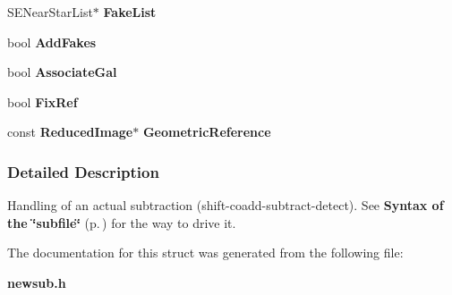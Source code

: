 \begin{CompactItemize}
\item 
{}
SENear\-Star\-List$\ast$ {\bf Fake\-List}\label{struct_newsub_m10}

\item 
{}
bool {\bf Add\-Fakes}\label{struct_newsub_m11}

\item 
{}
bool {\bf Associate\-Gal}\label{struct_newsub_m12}

\item 
{}
bool {\bf Fix\-Ref}\label{struct_newsub_m13}

\item 
{}
const {\bf Reduced\-Image}$\ast$ {\bf Geometric\-Reference}\label{struct_newsub_m14}

\end{CompactItemize}


\subsubsection{Detailed Description}
Handling of an actual subtraction (shift-coadd-subtract-detect). See {\bf Syntax of the \char`\"{}subfile\char`\"{}} {\rm (p.\,\pageref{subfile})} for the way to drive it.



The documentation for this struct was generated from the following file:\begin{CompactItemize}
\item 
{\bf newsub.h}\end{CompactItemize}

